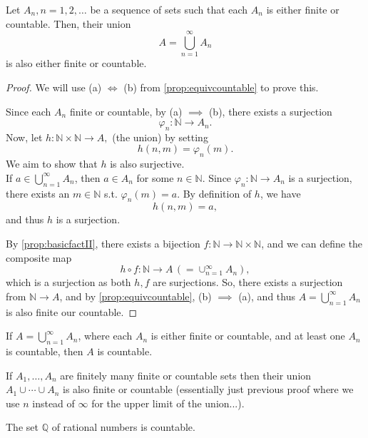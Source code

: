 \documentclass[12pt]{article}
\begin{document}
\begin{theorem}\label{thm:infiniteunion}
  Let $A_n, n = 1,2,\dots$ be a sequence of sets such that each $A_n$ is either finite or countable. Then, their union \[A = \bigcup_{n=1}^\infty A_n\] is also either finite or countable.
\end{theorem}

\begin{proof}
  We will use (a) $\iff$ (b) from \cref{prop:equivcountable} to prove this.

  Since each $A_n$ finite or countable, by (a) $\implies$ (b), there exists a surjection $$\varphi_n: \mathbb{N} \to A_n.$$ Now, let $h: \mathbb{N} \times \mathbb{N} \to A,$ (the union) by setting \[h(n,m) = \varphi_n(m).\] We aim to show that $h$ is also surjective.\\ If $a \in \bigcup_{n=1}^\infty A_n$, then $a \in A_n$ for some $n \in \mathbb{N}$. Since $\varphi_n : \mathbb{N} \to A_n$ is a surjection, there exists an $m \in \mathbb{N}$ s.t. $\varphi_n(m) = a$. By definition of $h$, we have \[h(n,m) = a,\] and thus $h$ is a surjection.

  By \cref{prop:basicfactII}, there exists a bijection $f: \mathbb{N} \to \mathbb{N} \times \mathbb{N}$, and we can define the composite map \[h \circ f : \mathbb{N} \to A\,(= \cup_{n=1}^\infty A_n),\] which is a surjection as both $h,f$ are surjections. So, there exists a surjection from $\mathbb{N} \to A$, and by \cref{prop:equivcountable}, (b) $\implies$ (a), and thus $A = \bigcup_{n=1}^\infty A_n$ is also finite our countable.

\end{proof}

\begin{remark}
  If $A = \bigcup_{n=1}^\infty A_n$, where each $A_n$ is either finite or countable, and at least one $A_n$ is countable, then $A$ is countable.
\end{remark}

\begin{remark}
  If $A_1, \dots,  A_n$ are finitely many finite or countable sets then their union $A_1 \cup \cdots \cup A_n$ is also finite or countable (essentially just previous proof where we use $n$ instead of $\infty$ for the upper limit of the union...). 
\end{remark}

\begin{theorem}\label{thm:countablerationals}
  The set $\mathbb{Q}$ of rational numbers is countable.
\end{theorem}
\end{document}
